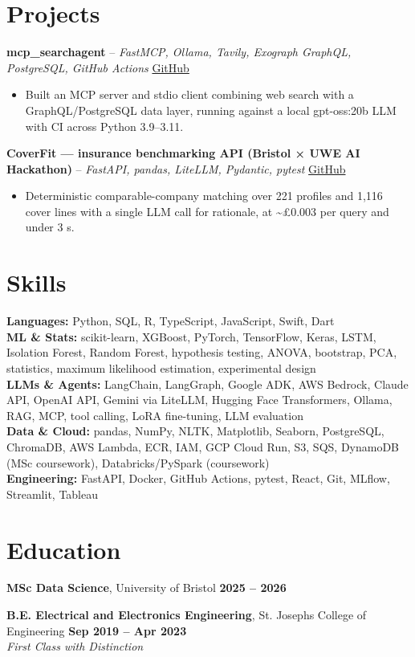 \documentclass[a4paper,10pt]{article}
\begin{document}
\section{Projects}
\noindent\textbf{mcp\_searchagent} -- \textit{FastMCP, Ollama, Tavily, Exograph GraphQL, PostgreSQL, GitHub Actions} \hfill \href{https://github.com/Thiruvel-AP/mcp_searchagent}{GitHub}
\begin{itemize}
  \item Built an MCP server and stdio client combining web search with a GraphQL/PostgreSQL data layer, running against a local gpt-oss:20b LLM with CI across Python 3.9–3.11.
\end{itemize}
\noindent\textbf{CoverFit — insurance benchmarking API (Bristol × UWE AI Hackathon)} -- \textit{FastAPI, pandas, LiteLLM, Pydantic, pytest} \hfill \href{https://github.com/Thiruvel-AP/AIHackathon-Phoenix}{GitHub}
\begin{itemize}
  \item Deterministic comparable-company matching over 221 profiles and 1,116 cover lines with a single LLM call for rationale, at \textasciitilde{}£0.003 per query and under 3 s.
\end{itemize}

\section{Skills}
\textbf{Languages:} Python, SQL, R, TypeScript, JavaScript, Swift, Dart\\
\textbf{ML \& Stats:} scikit-learn, XGBoost, PyTorch, TensorFlow, Keras, LSTM, Isolation Forest, Random Forest, hypothesis testing, ANOVA, bootstrap, PCA, statistics, maximum likelihood estimation, experimental design\\
\textbf{LLMs \& Agents:} LangChain, LangGraph, Google ADK, AWS Bedrock, Claude API, OpenAI API, Gemini via LiteLLM, Hugging Face Transformers, Ollama, RAG, MCP, tool calling, LoRA fine-tuning, LLM evaluation\\
\textbf{Data \& Cloud:} pandas, NumPy, NLTK, Matplotlib, Seaborn, PostgreSQL, ChromaDB, AWS Lambda, ECR, IAM, GCP Cloud Run, S3, SQS, DynamoDB (MSc coursework), Databricks/PySpark (coursework)\\
\textbf{Engineering:} FastAPI, Docker, GitHub Actions, pytest, React, Git, MLflow, Streamlit, Tableau

\section{Education}
\textbf{MSc Data Science}, University of Bristol \hfill \textbf{2025 – 2026}\par
\vspace{2pt}
\textbf{B.E. Electrical and Electronics Engineering}, St. Joseph\textquotesingle{}s College of Engineering \hfill \textbf{Sep 2019 – Apr 2023}\\ \textit{First Class with Distinction}\par
\end{document}
